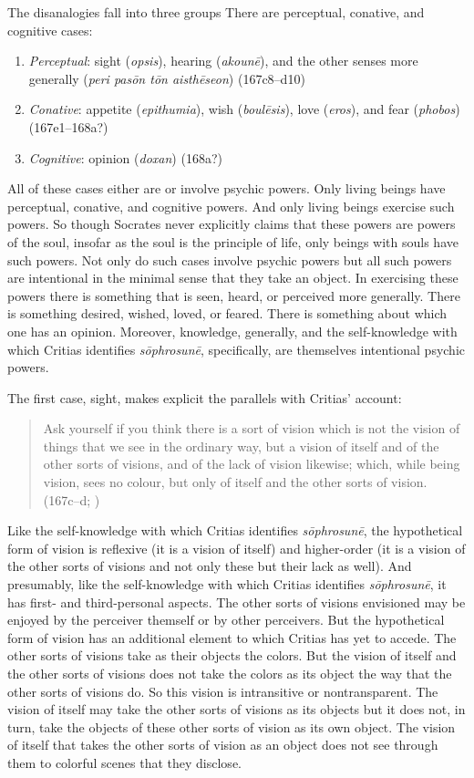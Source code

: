 The disanalogies fall into three groups There are perceptual, conative, and cognitive cases:
\begin{enumerate}[(1)]
	\item \emph{Perceptual}: sight (\emph{opsis}), hearing (\emph{akounē}), and the other senses more generally (\emph{peri pasōn tōn aisthēseon}) (167c8–d10)
	\item \emph{Conative}: appetite (\emph{epithumia}), wish (\emph{boulēsis}), love (\emph{eros}), and fear (\emph{phobos}) (167e1–168a?)
	\item \emph{Cognitive}: opinion (\emph{doxan}) (168a?)
\end{enumerate}
All of these cases either are or involve psychic powers. Only living beings have perceptual, conative, and cognitive powers. And only living beings exercise such powers. So though Socrates never explicitly claims that these powers are powers of the soul, insofar as the soul is the principle of life, only beings with souls have such powers. Not only do such cases involve psychic powers but all such powers are intentional in the minimal sense that they take an object. In exercising these powers there is something that is seen, heard, or perceived more generally. There is something desired, wished, loved, or feared. There is something about which one has an opinion. Moreover, knowledge, generally, and the self-knowledge with which Critias identifies \emph{sōphrosunē}, specifically, are themselves intentional psychic powers.

The first case, sight, makes explicit the parallels with Critias' account:
\begin{quote}
	Ask yourself if you think there is a sort of vision which is not the vision of things that we see in the ordinary way, but a vision of itself and of the other sorts of visions, and of the lack of vision likewise; which, while being vision, sees no colour, but only of itself and the other sorts of vision. (167c–d; \citealt[59]{Lamb:1927qw})
\end{quote}
Like the self-knowledge with which Critias identifies \emph{sōphrosunē}, the hypothetical form of vision is reflexive (it is a vision of itself) and higher-order (it is a vision of the other sorts of visions and not only these but their lack as well). And presumably, like the self-knowledge with which Critias identifies \emph{sōphrosunē}, it has first- and third-personal aspects. The other sorts of visions envisioned may be enjoyed by the perceiver themself or by other perceivers. But the hypothetical form of vision has an additional element to which Critias has yet to accede. The other sorts of visions take as their objects the colors. But the vision of itself and the other sorts of visions does not take the colors as its object the way that the other sorts of visions do. So this vision is intransitive or nontransparent. The vision of itself may take the other sorts of visions as its objects but it does not, in turn, take the objects of these other sorts of vision as its own object. The vision of itself that takes the other sorts of vision as an object does not see through them to colorful scenes that they disclose.

